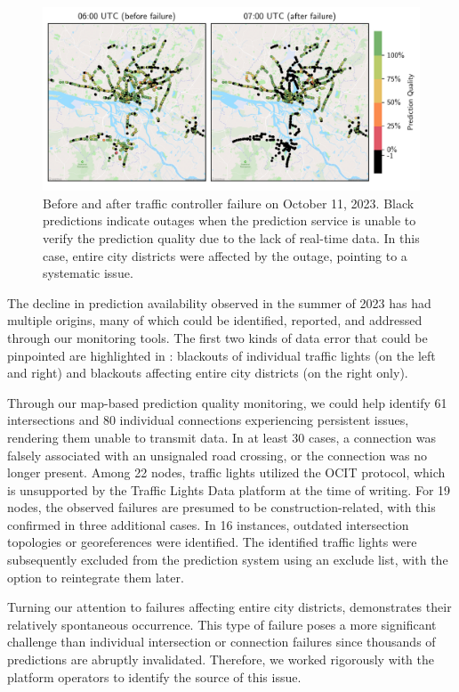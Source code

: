 \begin{figure}[t]
    \centering
    \includegraphics[width=\linewidth]{images/monitoring-before-after-failure.pdf}
    \caption{Before and after traffic controller failure on October 11, 2023. Black predictions indicate outages when the prediction service is unable to verify the prediction quality due to the lack of real-time data. In this case, entire city districts were affected by the outage, pointing to a systematic issue.}\label{fig:monitoring-before-after-failure}
\end{figure}

The decline in prediction availability observed in the summer of 2023 has had multiple origins, many of which could be identified, reported, and addressed through our monitoring tools. The first two kinds of data error that could be pinpointed are highlighted in  : blackouts of individual traffic lights (on the left and right) and blackouts affecting entire city districts (on the right only).

Through our map-based prediction quality monitoring, we could help identify 61 intersections and 80 individual connections experiencing persistent issues, rendering them unable to transmit data. In at least 30 cases, a connection was falsely associated with an unsignaled road crossing, or the connection was no longer present. Among 22 nodes, traffic lights utilized the OCIT protocol, which is unsupported by the Traffic Lights Data platform at the time of writing. For 19 nodes, the observed failures are presumed to be construction-related, with this confirmed in three additional cases. In 16 instances, outdated intersection topologies or georeferences were identified. The identified traffic lights were subsequently excluded from the prediction system using an exclude list, with the option to reintegrate them later.

Turning our attention to failures affecting entire city districts,  demonstrates their relatively spontaneous occurrence. This type of failure poses a more significant challenge than individual intersection or connection failures since thousands of predictions are abruptly invalidated. Therefore, we worked rigorously with the platform operators to identify the source of this issue.

